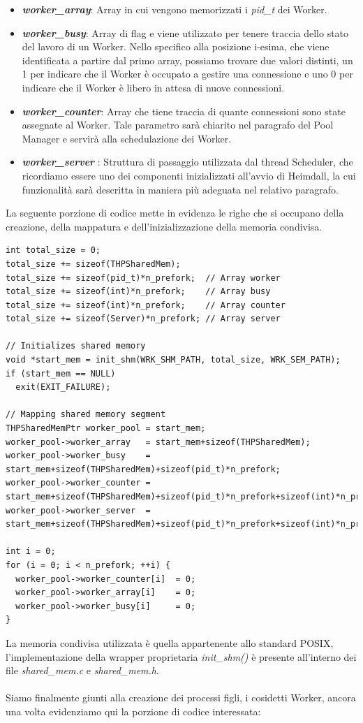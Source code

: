 \documentclass[italian]{tktltiki2}
\begin{document}
\begin{itemize}
  \item \textbf{\emph{worker\_array}}: Array in cui vengono memorizzati i \emph{pid\_t} dei Worker.          
  \item \textbf{\emph{worker\_busy}}: Array di flag e viene utilizzato per tenere traccia dello stato del lavoro di un Worker. Nello specifico alla posizione i-esima, che viene identificata a partire dal primo array, possiamo trovare due valori distinti, un 1 per indicare che il Worker è occupato a gestire una connessione e uno 0 per indicare che il Worker è libero in attesa di nuove connessioni.
  \item \textbf{\emph{worker\_counter}}: Array che tiene traccia di quante connessioni sono state assegnate al Worker. Tale parametro sarà chiarito nel paragrafo del Pool Manager e servirà alla schedulazione dei Worker.
  \item \textbf{\emph{worker\_server}} \label{ssec:shm_server} : Struttura di passaggio utilizzata dal thread Scheduler, che ricordiamo essere uno dei componenti inizializzati all'avvio di Heimdall, la cui funzionalità sarà descritta in maniera più adeguata nel relativo paragrafo.
\end{itemize}
La seguente porzione di codice mette in evidenza le righe che si occupano della creazione, della mappatura e dell'inizializzazione della memoria condivisa.
\begin{lstlisting}
int total_size = 0;
total_size += sizeof(THPSharedMem);
total_size += sizeof(pid_t)*n_prefork;  // Array worker
total_size += sizeof(int)*n_prefork;    // Array busy
total_size += sizeof(int)*n_prefork;    // Array counter
total_size += sizeof(Server)*n_prefork; // Array server

// Initializes shared memory
void *start_mem = init_shm(WRK_SHM_PATH, total_size, WRK_SEM_PATH);
if (start_mem == NULL)
  exit(EXIT_FAILURE);

// Mapping shared memory segment
THPSharedMemPtr worker_pool = start_mem;
worker_pool->worker_array   = start_mem+sizeof(THPSharedMem);
worker_pool->worker_busy    = start_mem+sizeof(THPSharedMem)+sizeof(pid_t)*n_prefork;
worker_pool->worker_counter = start_mem+sizeof(THPSharedMem)+sizeof(pid_t)*n_prefork+sizeof(int)*n_prefork;
worker_pool->worker_server  = start_mem+sizeof(THPSharedMem)+sizeof(pid_t)*n_prefork+sizeof(int)*n_prefork+sizeof(int)*n_prefork;

int i = 0;
for (i = 0; i < n_prefork; ++i) {
  worker_pool->worker_counter[i]  = 0;
  worker_pool->worker_array[i]    = 0;
  worker_pool->worker_busy[i]     = 0;
}
\end{lstlisting}
La memoria condivisa utilizzata è quella appartenente allo standard POSIX, l'implementazione della wrapper proprietaria \emph{init\_shm()} è presente all'interno dei file \emph{shared\_mem.c} e \emph{shared\_mem.h}.
\\
\\
Siamo finalmente giunti alla creazione dei processi figli, i cosidetti Worker, ancora una volta evidenziamo qui la porzione di codice interessata:
\end{document}
